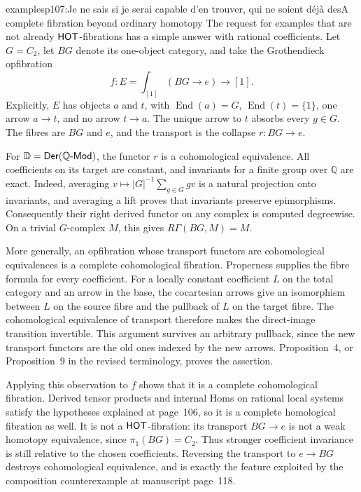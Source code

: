 \begin{dcomment}{examples}{p107:Je ne sais si je serai capable d'en trouver, qui ne soient déjà des}{A complete fibration beyond ordinary homotopy}
The request for examples that are not already $\mathsf{HOT}$-fibrations has a simple answer with rational coefficients. Let $G=C_2$, let $BG$ denote its one-object category, and take the Grothendieck opfibration
\[
 f:E=\int_{[1]}(BG\longrightarrow e)\longrightarrow[1].
\]
Explicitly, $E$ has objects $a$ and $t$, with $\operatorname{End}(a)=G$, $\operatorname{End}(t)=\{1\}$, one arrow $a\to t$, and no arrow $t\to a$. The unique arrow to $t$ absorbs every $g\in G$. The fibres are $BG$ and $e$, and the transport is the collapse $r:BG\to e$.

For $\mathbb{D}=\mathsf{Der}(\mathbb Q\text{-}\mathsf{Mod})$, the functor $r$ is a cohomological equivalence. All coefficients on its target are constant, and invariants for a finite group over $\mathbb Q$ are exact. Indeed, averaging $v\mapsto |G|^{-1}\sum_{g\in G}gv$ is a natural projection onto invariants, and averaging a lift proves that invariants preserve epimorphisms. Consequently their right derived functor on any complex is computed degreewise. On a trivial $G$-complex $M$, this gives $R\Gamma(BG,M)=M$.

More generally, an opfibration whose transport functors are cohomological equivalences is a complete cohomological fibration. Properness supplies the fibre formula for every coefficient. For a locally constant coefficient $L$ on the total category and an arrow in the base, the cocartesian arrows give an isomorphism between $L$ on the source fibre and the pullback of $L$ on the target fibre. The cohomological equivalence of transport therefore makes the direct-image transition invertible. This argument survives an arbitrary pullback, since the new transport functors are the old ones indexed by the new arrows. Proposition~4, or Proposition~9 in the revised terminology, proves the assertion.

Applying this observation to $f$ shows that it is a complete cohomological fibration. Derived tensor products and internal Homs on rational local systems satisfy the hypotheses explained at page~106, so it is a complete homological fibration as well. It is not a $\mathsf{HOT}$-fibration: its transport $BG\to e$ is not a weak homotopy equivalence, since $\pi_1(BG)=C_2$. Thus stronger coefficient invariance is still relative to the chosen coefficients. Reversing the transport to $e\to BG$ destroys cohomological equivalence, and is exactly the feature exploited by the composition counterexample at manuscript page~118.
\end{dcomment}


